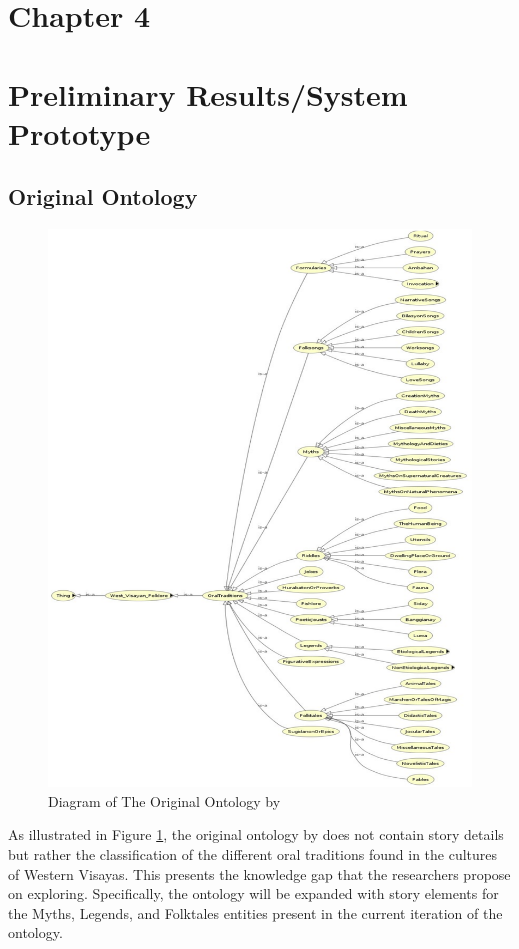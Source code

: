 \section*{Chapter 4}
\section{Preliminary Results/System Prototype}
\subsection{Original Ontology}
\begin{figure}[H]
    \centering
    \includegraphics[width=\linewidth]{figures/Dimzon and Dimzon (2015) Ontology.png}
    \caption{Diagram of The Original Ontology by \protect{}}
    \label{fig:ontology diagram}
\end{figure}

As illustrated in Figure \ref{fig:ontology diagram}, the original ontology by  does not contain story details but rather the classification of the different oral traditions found in the cultures of Western Visayas. This presents the knowledge gap that the researchers propose on exploring. Specifically, the ontology will be expanded with story elements for the Myths, Legends, and Folktales entities present in the current iteration of the ontology.

